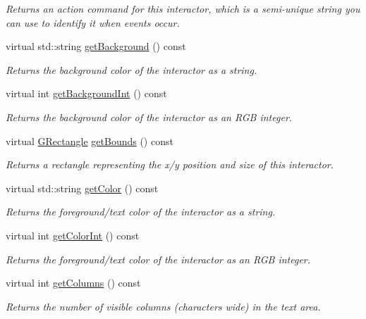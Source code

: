 \begin{DoxyCompactItemize}
\begin{DoxyCompactList}\small\item\em Returns an action command for this interactor, which is a semi-\/unique string you can use to identify it when events occur. \end{DoxyCompactList}\item 
virtual std\+::string \mbox{\hyperlink{classGInteractor_a808e22cc1fdfbecf71ed8c64ef4600e0}{get\+Background}} () const
\begin{DoxyCompactList}\small\item\em Returns the background color of the interactor as a string. \end{DoxyCompactList}\item 
virtual int \mbox{\hyperlink{classGInteractor_a9e827257a55cb8cf4d9de2ec6bcfd7a0}{get\+Background\+Int}} () const
\begin{DoxyCompactList}\small\item\em Returns the background color of the interactor as an R\+GB integer. \end{DoxyCompactList}\item 
virtual \mbox{\hyperlink{classGRectangle}{G\+Rectangle}} \mbox{\hyperlink{classGInteractor_a29e6ac35a0b48f491a4c88194cc5da3b}{get\+Bounds}} () const
\begin{DoxyCompactList}\small\item\em Returns a rectangle representing the x/y position and size of this interactor. \end{DoxyCompactList}\item 
virtual std\+::string \mbox{\hyperlink{classGInteractor_aa061dfa488c31e18549d64363c1d0e34}{get\+Color}} () const
\begin{DoxyCompactList}\small\item\em Returns the foreground/text color of the interactor as a string. \end{DoxyCompactList}\item 
virtual int \mbox{\hyperlink{classGInteractor_a9635c7af766cdc3417f346683fa0e6c1}{get\+Color\+Int}} () const
\begin{DoxyCompactList}\small\item\em Returns the foreground/text color of the interactor as an R\+GB integer. \end{DoxyCompactList}\item 
virtual int \mbox{\hyperlink{classGTextArea_a6b5395e749ae5c217093d74f68f1ca3a}{get\+Columns}} () const
\begin{DoxyCompactList}\small\item\em Returns the number of visible columns (characters wide) in the text area. \end{DoxyCompactList}\item 

\end{DoxyCompactItemize}
